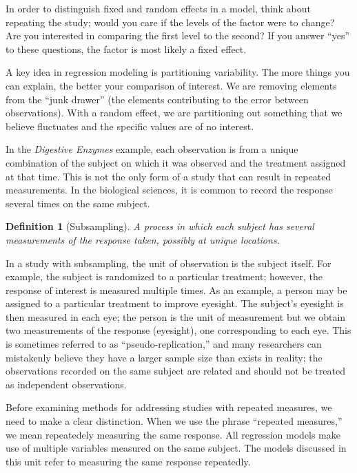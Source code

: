 \documentclass[
]{book}
\theoremstyle{plain}
\theoremstyle{mydefn}
\newtheorem{definition}{Definition}[chapter]
\theoremstyle{myexmpl}
\theoremstyle{remark}
\begin{document}
\begin{rmdtip}
In order to distinguish fixed and random effects in a model, think about repeating the study; would you care if the levels of the factor were to change? Are you interested in comparing the first level to the second? If you answer ``yes'' to these questions, the factor is most likely a fixed effect.
\end{rmdtip}

A key idea in regression modeling is partitioning variability. The more things you can explain, the better your comparison of interest. We are removing elements from the ``junk drawer'' (the elements contributing to the error between observations). With a random effect, we are partitioning out something that we believe fluctuates and the specific values are of no interest.

In the \emph{Digestive Enzymes} example, each observation is from a unique combination of the subject on which it was observed and the treatment assigned at that time. This is not the only form of a study that can result in repeated measurements. In the biological sciences, it is common to record the response several times on the same subject.

\begin{definition}[Subsampling]
A process in which each subject has several measurements of the response taken, possibly at unique locations.
\end{definition}

In a study with subsampling, the unit of observation is the subject itself. For example, the subject is randomized to a particular treatment; however, the response of interest is measured multiple times. As an example, a person may be assigned to a particular treatment to improve eyesight. The subject's eyesight is then measured in each eye; the person is the unit of measurement but we obtain two measurements of the response (eyesight), one corresponding to each eye. This is sometimes referred to as ``pseudo-replication,'' and many researchers can mistakenly believe they have a larger sample size than exists in reality; the observations recorded on the same subject are related and should not be treated as independent observations.

Before examining methods for addressing studies with repeated measures, we need to make a clear distinction. When we use the phrase ``repeated measures,'' we mean repeatedely measuring the same response. All regression models make use of multiple variables measured on the same subject. The models discussed in this unit refer to measuring the same response repeatedly.
\end{document}
